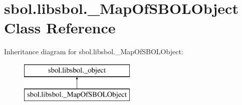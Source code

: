\hypertarget{classsbol_1_1libsbol_1_1___map_of_s_b_o_l_object}{}\section{sbol.\+libsbol.\+\_\+\+Map\+Of\+S\+B\+O\+L\+Object Class Reference}
\label{classsbol_1_1libsbol_1_1___map_of_s_b_o_l_object}
Inheritance diagram for sbol.\+libsbol.\+\_\+\+Map\+Of\+S\+B\+O\+L\+Object\+:\begin{figure}[H]
\begin{center}
\leavevmode
\includegraphics[height=2.000000cm]{classsbol_1_1libsbol_1_1___map_of_s_b_o_l_object}
\end{center}
\end{figure}
